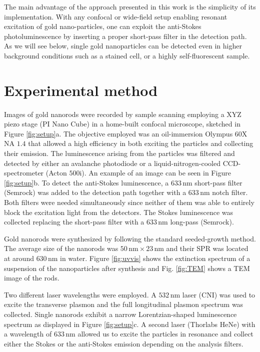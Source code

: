 \documentclass[journal=nalefd,manuscript=letter]{achemso}
\newcommand{\nm}{\ensuremath{\,\textrm{nm}}}
\begin{document}
The main advantage of the approach presented in this work is the simplicity of
its implementation. With any confocal or wide-field setup enabling resonant
excitation of gold nano-particles, one can exploit the anti-Stokes
photoluminescence by inserting a proper short-pass filter in the detection path.
As we will see below, single gold nanoparticles can be detected even in higher background conditions
such as a stained cell, or a highly self-fluorescent sample.

\section{Experimental method}
Images of gold nanorods were recorded by sample scanning employing a XYZ piezo
stage (PI Nano Cube) in a  home-built confocal microscope, sketched in Figure
\ref{fig:setup}a. The objective employed was an oil-immersion Olympus 60X NA
$1.4$ that allowed a high efficiency in both exciting the particles and
collecting their emission. The luminescence arising from the particles was
filtered and detected by either an avalanche photodiode or a
liquid-nitrogen-cooled CCD-spectrometer (Acton $500\textrm{i}$). An example of
an image can be seen in Figure \ref{fig:setup}b. To detect the anti-Stokes
luminescence, a $633\nm$ short-pass filter (Semrock) was added to the detection
path together with a $633\nm$ notch filter. Both filters were needed
simultaneously since neither of them was able to entirely block the excitation
light from the detectors. The Stokes luminescence was collected replacing the
short-pass filter with a $633\nm$ long-pass (Semrock).

Gold nanorods were synthesized by following the standard seeded-growth
method\cite{Nikoobakht2003}. The average size of the nanorods was $50\nm\times
23\nm$ and their SPR was located at around $630\nm$ in water. Figure
\ref{fig:uvvis} shows the extinction spectrum of a suspension of the
nanoparticles after synthesis and Fig. \ref{fig:TEM} shows a TEM image of the
rods.

Two different laser wavelengths were employed. A $532\nm$ laser (CNI) was used
to excite the transverse plasmon and the full longitudinal plasmon
spectrum was collected. Single nanorods exhibit a narrow Lorentzian-shaped luminescence
spectrum as displayed in Figure \ref{fig:setup}c. A second laser (Thorlabs HeNe)
with a wavelength of $633\nm$ allowed us to excite the particles in resonance
and collect either the Stokes or the anti-Stokes emission depending on the
analysis filters.
\end{document}
